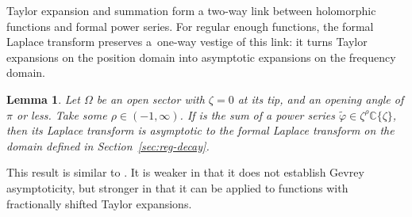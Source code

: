 \documentclass[pdftex]{sigma}
\newcommand{\singexp}[2]{\mathcal{H}L^\infty_{#1, #2}}
\newcommand{\C}{\mathbb{C}}
\newcommand{\series}[1]{\tilde{#1}}
\newcommand{\laplace}{\mathcal{L}}
\numberwithin{equation}{section}
\newtheorem{Lemma}[Theorem]{Lemma}
\begin{document}
Taylor expansion and summation form a two-way link between holomorphic functions and formal power series. For regular enough functions, the formal Laplace transform preserves a~one-way vestige of this link: it turns Taylor expansions on the position domain into asymptotic expansions on the frequency domain.
\begin{Lemma}\label{lem:laplace-bridge}
Let $\Omega$ be an open sector with $\zeta = 0$ at its tip, and an opening angle of $\pi$ or less. Take some $\rho \in (-1,\infty)$. If \smash{$\varphi \in \singexp{\rho}{\Lambda}(\Omega)$} is the sum of a power series $\series{\varphi} \in \zeta^\rho \C\{\zeta\}$, then its Laplace transform \smash{$\Phi = \laplace_{\zeta, 0}^\theta \varphi$} is asymptotic to the formal Laplace transform \smash{$\series{\Phi} = \laplace_{\zeta, 0}^\theta \series{\varphi}$} on the domain  defined in Section~{\rm\ref{sec:reg-decay}}.
\end{Lemma}
\begin{Remark}
This result is similar to \cite[Theorem~5.20]{diverg-resurg-i}. It is weaker in that it does not establish Gevrey asymptoticity, but stronger in that it can be applied to functions with fractionally shifted Taylor expansions.
\end{Remark}
\end{document}
